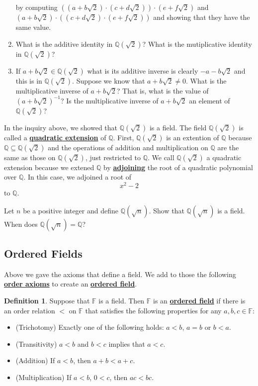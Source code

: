 \documentclass[11pt]{article}
\newenvironment{task}
	{\begin{mdframed}[linecolor=lightgray, linewidth=3pt]\raggedright}
	{\end{mdframed}}
\renewcommand\emph[1]{\underline{\bf{#1}}} %
\theoremstyle{definition}
\newtheorem{definition}[theorem]{Definition}
\begin{document}
\begin{task}
\begin{enumerate}
      by computing $((a+b\sqrt{2})\cdot (c+d\sqrt{2}))\cdot (e + f\sqrt{2})$ and $(a+b\sqrt{2})\cdot ( (c+d\sqrt{2})\cdot (e+f\sqrt{2}) )$ and showing that 
      they have the same value.
    \item What is the additive identity in $\mathbb{Q}(\sqrt{2})$? What is the mutiplicative identity in $\mathbb{Q}(\sqrt{2})$?
    \item If $a+b\sqrt{2}\in \mathbb{Q}(\sqrt{2})$ what is its additive inverse is clearly $-a-b\sqrt{2}$ and this is in $\mathbb{Q}(\sqrt{2})$. Suppose
      we know that $a+b\sqrt{2} \neq 0$. What is the multiplicative inverse of $a+b\sqrt{2}$? That is, what is the value of $(a+b\sqrt{2})^{-1}$? Is
      the multiplicative inverse of $a+b\sqrt{2}$ an element of $\mathbb{Q}(\sqrt{2})$?
  \end{enumerate}

\end{task}

In the inquiry above, we showed that $\mathbb{Q}(\sqrt{2})$ is a field.  The field $\mathbb{Q}(\sqrt{2})$ is called a \emph{quadratic extension}
of $\mathbb{Q}$. First, $\mathbb{Q}(\sqrt{2})$ is an extention of $\mathbb{Q}$ because $\mathbb{Q}\subseteq \mathbb{Q}(\sqrt{2})$ and the operations of addition and
multiplication on $\mathbb{Q}$ are the same as those on $\mathbb{Q}(\sqrt{2})$, just restricted to $\mathbb{Q}$. We call $\mathbb{Q}(\sqrt{2})$ a
quadratic extension because we extened $\mathbb{Q}$ by \emph{adjoining} the root of a quadratic polynomial over $\mathbb{Q}$. In this case, we adjoined
a root of
\[ x^2 -2 \]
to $\mathbb{Q}$. 

\begin{task}
  Let $n$ be a positive integer and define $\mathbb{Q}(\sqrt{n})$. Show that $\mathbb{Q}(\sqrt{n})$ is a field. When does $\mathbb{Q}(\sqrt{n})=\mathbb{Q}$?
\end{task}

\subsection{Ordered Fields}

Above we gave the axioms that define a field. We add to those the following \emph{order axioms} to create an \emph{ordered field}.

\begin{definition} Suppose that $\mathbb{F}$ is a field. Then $\mathbb{F}$ is an \emph{ordered field} if there is an order
  relation $<$ on $\mathbb{F}$ that satisfies the following properties for any $a,b,c\in\mathbb{F}$:
\begin{itemize}
  \item (Trichotomy) Exactly one of the following holds: $a < b$, $a=b$ or $b < a$.
  \item (Transitivity) $a< b$ and $b < c$ implies that $a < c$.
  \item (Addition) If $a< b$, then $a+b < a+c$.
  \item (Multiplication) If $a < b$, $0 < c$, then $ac < bc$.
\end{itemize}
\end{definition}
\end{document}
